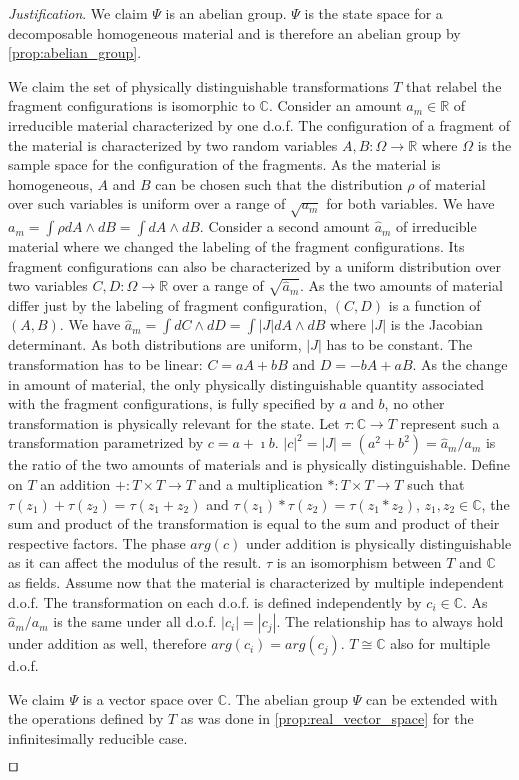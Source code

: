 \documentclass[smallextended]{svjour3}
\numberwithin{equation}{section}
\newenvironment{justification}{\emph{Justification}.}{\hfill\(\qed\)}
\theoremstyle{definition}
\newenvironment{justification}{\emph{Justification}.}{\qed}
\begin{document}
\begin{justification}
	We claim $\Psi$ is an abelian group. $\Psi$ is the state space for a decomposable homogeneous material and is therefore an abelian group  by \ref{prop:abelian_group}.
	
	We claim the set of physically distinguishable transformations $T$ that relabel the fragment configurations is isomorphic to $\mathbb{C}$. Consider an amount $a_m \in \mathbb{R}$ of irreducible material characterized by one d.o.f. The configuration of a fragment of the material is characterized by two random variables $A, B: \Omega \rightarrow \mathbb{R}$ where $\Omega$ is the sample space for the configuration of the fragments. As the material is homogeneous, $A$ and $B$ can be chosen such that the distribution $\rho$ of material over such variables is uniform over a range of $\sqrt{a_m}$ for both variables. We have $a_m=\int \rho dA \wedge dB = \int dA \wedge dB$. Consider a second amount $\hat{a}_m$ of irreducible material where we changed the labeling of the fragment configurations. Its fragment configurations can also be characterized by a uniform distribution over two variables $C, D: \Omega \rightarrow \mathbb{R}$ over a range of $\sqrt{\hat{a}_m}$. As the two amounts of material differ just by the labeling of fragment configuration, $(C,D)$ is a function of $(A,B)$. We have $\hat{a}_m = \int dC \wedge dD = \int |J| dA \wedge dB$ where $|J|$ is the Jacobian determinant. As both distributions are uniform, $|J|$ has to be constant. The transformation has to be linear: $C=aA + bB$ and $D=-bA + aB$. As the change in amount of material, the only physically distinguishable quantity associated with the fragment configurations, is fully specified by $a$ and $b$, no other transformation is physically relevant for the state. Let $\tau: \mathbb{C} \rightarrow T$ represent such a transformation parametrized by $c=a+\imath b$. $|c|^2 = |J| = (a^2 + b^2) = \hat{a}_m / a_m$ is the ratio of the two amounts of materials and is physically distinguishable. Define on $T$ an addition $+: T \times T \rightarrow T$ and a multiplication $*: T \times T \rightarrow T$ such that $\tau(z_1) + \tau(z_2) = \tau(z_1+z_2)$ and $\tau(z_1) * \tau(z_2) = \tau(z_1*z_2)$, $z_1,z_2 \in \mathbb{C}$, the sum and product of the transformation is equal to the sum and product of their respective factors. The phase $arg(c)$ under addition is physically distinguishable as it can affect the modulus of the result. $\tau$ is an isomorphism between $T$ and $\mathbb{C}$ as fields. Assume now that the material is characterized by multiple independent d.o.f. The transformation on each d.o.f. is defined independently by $c_i \in \mathbb{C}$. As $\hat{a}_m / a_m$ is the same under all d.o.f. $|c_i|=|c_j|$. The relationship has to always hold under addition as well, therefore $arg(c_i) = arg(c_j)$. $T\cong \mathbb{C}$ also for multiple d.o.f.

	We claim $\Psi$ is a vector space over $\mathbb{C}$. The abelian group $\Psi$ can be extended with the operations defined by $T$ as was done in \ref{prop:real_vector_space} for the infinitesimally reducible case.
	
\end{justification}
\end{document}
